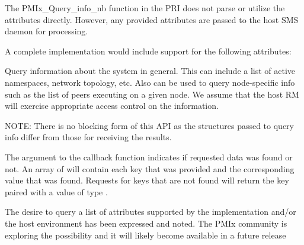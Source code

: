 \priattr
The PMIx_Query_info_nb function in the \ac{PRI} does not parse or utilize the attributes directly. However, any provided attributes are passed to the host \ac{SMS} daemon for processing.

\optattr
A complete implementation would include support for the following attributes:


\descr

Query information about the system in general.
This can include a list of active namespaces, network topology, etc.
Also can be used to query node-specific info such as the list of peers executing on a given node.
We assume that the host \ac{RM} will exercise appropriate access control on the information.

NOTE: There is no blocking form of this API as the structures passed to query info differ from those for receiving the results.

The  argument to the callback function indicates if requested data was found or not.
An array of  will contain each key that was provided and the corresponding value that was found. Requests for keys that are not found will return the key paired with a value of type .

\adviceuserstart
The desire to query a list of attributes supported by the implementation and/or the host environment has been expressed and noted. The \ac{PMIx} community is exploring the possibility and it will likely become available in a future release
\adviceuserend



